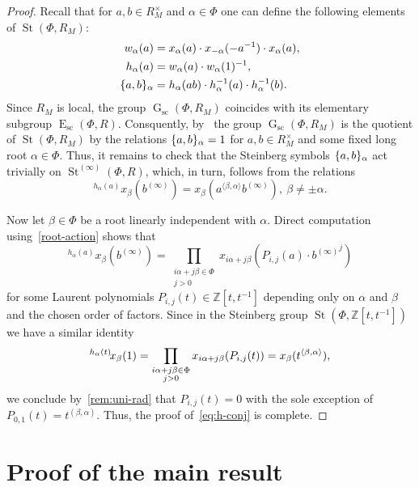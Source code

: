 \documentclass[oneside, 11pt]{amsart}
\numberwithin{equation}{section}
\theoremstyle{definition}
\theoremstyle{remark}
\DeclareMathOperator\St{St}
\DeclareMathOperator\GG{G}
\DeclareMathOperator\E{E}
\newcommand{\up}[2]{{^{#1}\!{#2}}}
\begin{document}
\begin{proof}
 Recall that for \(a, b \in R_M^\times\) and \(\alpha \in \Phi\) one can define the following elements of $\St(\Phi, R_M)$: 
  \begin{align*} w_\alpha(a) & =  x_\alpha(a) \cdot x_{-\alpha}(-a^{-1}) \cdot x_\alpha(a), \\
                 h_\alpha(a) & =  w_\alpha(a) \cdot w_\alpha(1)^{-1}, \\
                 \{ a,\-b \}_\alpha & = h_\alpha(ab) \cdot h_\alpha^{-1}(a) \cdot h_\alpha^{-1}(b). \end{align*}
 Since $R_M$ is local, the group $\GG_{\mathrm{sc}}(\Phi, R_M)$ coincides with its elementary subgroup $\E_{\mathrm{sc}}(\Phi, R)$.
 Consquently, by~\cite[Theorem~2.13]{Ste73} the group \(\GG_{\mathrm{sc}}(\Phi, R_M)\) is the quotient of \(\St(\Phi, R_M)\) by the relations $\{a,\-b\}_\alpha = 1$ for \(a, b \in R_M^\times\) and some fixed long root $\alpha\in\Phi$. Thus, it remains to check that the Steinberg symbols $\{a,\-b\}_\alpha$ act trivially on \(\St^{(\infty)}(\Phi, R)\), which, in turn, follows from the relations
 \begin{equation}\label{eq:h-conj} \up{h_\alpha(a)}x_\beta(b^{(\infty)}) = x_\beta(a^{\langle \beta, \alpha \rangle}b^{(\infty)}),\ \beta\neq\pm\alpha. \end{equation}
 
 Now let \(\beta \in \Phi\) be a root linearly independent with \(\alpha\).
 Direct computation using~\cref{root-action} shows that
 \[\up{h_\alpha(a)}{x_\beta(b^{(\infty)})} = \prod_{\substack{i\alpha + j\beta \in \Phi\\ j > 0}} x_{i\alpha + j\beta}(P_{i, j}(a) \cdot {b^{(\infty)}}^j)\]
 for some Laurent polynomials \(P_{i, j}(t) \in \mathbb Z[t, t^{-1}]\) depending only on \(\alpha\) and \(\beta\) and the chosen order of factors. Since in the Steinberg group \(\St(\Phi, \mathbb Z[t, t^{-1}])\) we have a similar identity
 \[\up{h_\alpha(t)}{x_\beta(1)} = \prod_{\substack{i\alpha + j\beta \in \Phi\\ j > 0}} x_{i\alpha + j\beta}(P_{i, j}(t)) = x_{\beta}(t^{\langle \beta,\-\alpha \rangle}),\]
 we conclude by~\cref{rem:uni-rad} that \(P_{i, j}(t) = 0\) with the sole exception of \(P_{0, 1}(t) = t^{(\beta, \alpha)}\). Thus, the proof of~\eqref{eq:h-conj} is complete.
\end{proof}

\section{Proof of the main result} \label{sec:proof-main}
\end{document}

